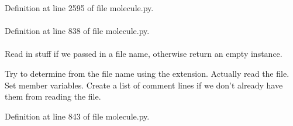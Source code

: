 \-Definition at line 2595 of file molecule.\-py.

\hypertarget{classforcebalance_1_1molecule_1_1Molecule_aa0768b07267ac7def14dd5224caa5708}{
\paragraph[{built\-\_\-bonds}]{}}\label{classforcebalance_1_1molecule_1_1Molecule_aa0768b07267ac7def14dd5224caa5708}


\-Definition at line 838 of file molecule.\-py.

\hypertarget{classforcebalance_1_1molecule_1_1Molecule_a5e092c726455a18c9300f5c5362121d8}{
\paragraph[{comms}]{}}\label{classforcebalance_1_1molecule_1_1Molecule_a5e092c726455a18c9300f5c5362121d8}


\-Read in stuff if we passed in a file name, otherwise return an empty instance. 

\-Try to determine from the file name using the extension. \-Actually read the file. \-Set member variables. \-Create a list of comment lines if we don't already have them from reading the file. 

\-Definition at line 843 of file molecule.\-py.

\hypertarget{classforcebalance_1_1molecule_1_1Molecule_a8698f94608be34eeba6eaa4c52dc5249}{
\paragraph[{\-Data}]{}}\label{classforcebalance_1_1molecule_1_1Molecule_a8698f94608be34eeba6eaa4c52dc5249}



